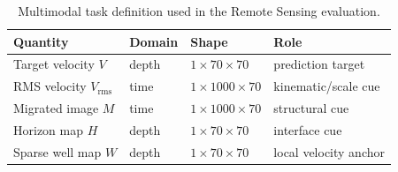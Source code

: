 \begin{table}[t]
\centering
\caption{Multimodal task definition used in the Remote Sensing evaluation.}
\label{tab:task-contract}
\begin{tabular}{llll}
\toprule
Quantity & Domain & Shape & Role \\
\midrule
Target velocity $V$ & depth & $1\times70\times70$ & prediction target \\
RMS velocity $V_{\mathrm{rms}}$ & time & $1\times1000\times70$ & kinematic/scale cue \\
Migrated image $M$ & time & $1\times1000\times70$ & structural cue \\
Horizon map $H$ & depth & $1\times70\times70$ & interface cue \\
Sparse well map $W$ & depth & $1\times70\times70$ & local velocity anchor \\
\bottomrule
\end{tabular}
\end{table}
